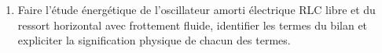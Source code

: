 \documentclass[a4paper, 12pt, final, garamond]{book}
\begin{document}
\begin{enumerate}
    \item Faire l'étude énergétique de l'oscillateur amorti électrique RLC libre
        et du ressort horizontal avec frottement fluide, identifier les termes
        du bilan et expliciter la signification physique de chacun des termes.
\end{enumerate}

% 
\end{document}
